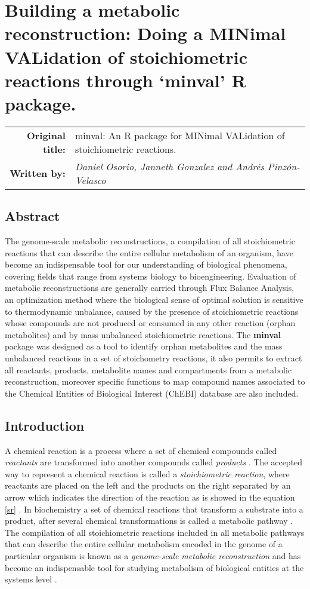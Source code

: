 \chapter{Building a metabolic reconstruction: Doing a MINimal VALidation of stoichiometric reactions through `minval' R package.}
\begin{tabular}{rm{12cm}}
\textsf{\textbf{Original title:}}& minval: An R package for MINimal VALidation of stoichiometric reactions.\\
\textsf{\textbf{Written by:}} & \textit{Daniel Osorio, Janneth Gonzalez and Andrés Pinzón-Velasco}\\ 
\end{tabular}
\section*{Abstract}
The genome-scale metabolic reconstructions, a compilation of all stoichiometric reactions that can describe the entire cellular metabolism of an organism, have become an indispensable tool for our understanding of biological phenomena, covering fields that range from systems biology to bioengineering. Evaluation of metabolic reconstructions are generally carried through Flux Balance Analysis, an optimization method where the biological sense of optimal solution is sensitive to thermodynamic unbalance, caused by the presence of stoichiometric reactions whose compounds are not produced or consumed in any other reaction (orphan metabolites) and by mass unbalanced stoichiometric reactions.  The \textbf{minval} package was designed as a tool to identify orphan metabolites and the mass unbalanced reactions in a set of stoichometry reactions, it also permits to extract all reactants, products, metabolite names and compartments from a metabolic reconstruction, moreover specific functions to map compound names associated to the Chemical Entities of Biological Interest (ChEBI) database are also included.
\section{Introduction}
A chemical reaction is a process where a set of chemical compounds called \emph{reactants} are transformed into another compounds called \emph{products} \cite{Chen2013}. The accepted way to represent a chemical reaction is called a \emph{stoichiometric reaction}, where reactants are placed on the left and the products on the right separated by an arrow which indicates the direction of the reaction as is showed in the equation \ref{sr} \cite{Hendrickson1997}. In biochemistry a set of chemical reactions that transform a substrate into a product, after several chemical transformations is called a metabolic pathway \cite{Lambert2011}. The compilation of all stoichiometric reactions included in all metabolic pathways that can describe the entire cellular metabolism encoded in the genome of a particular organism is known as a \emph{genome-scale metabolic reconstruction} \cite{Park2009} and has become an indispensable tool for studying metabolism of biological entities at the systems level \cite{Thiele2010}.

